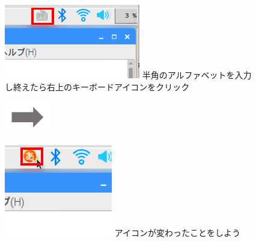 \begin{figure}
  \begin{minipage}{0.3\textwidth}
    \includegraphics[width=\linewidth]{text01-img/textbook-img059.png}
     半角のアルファベットを入力し終えたら右上のキーボードアイコンをクリック
  \end{minipage}
  \includegraphics[width=2cm]{text01-img/textbook-img073.png}
  \begin{minipage}{0.3\textwidth}
    \includegraphics[width=\linewidth]{text01-img/textbook-img062.png}
     アイコンが変わったことをしよう
  \end{minipage}


\end{figure}
